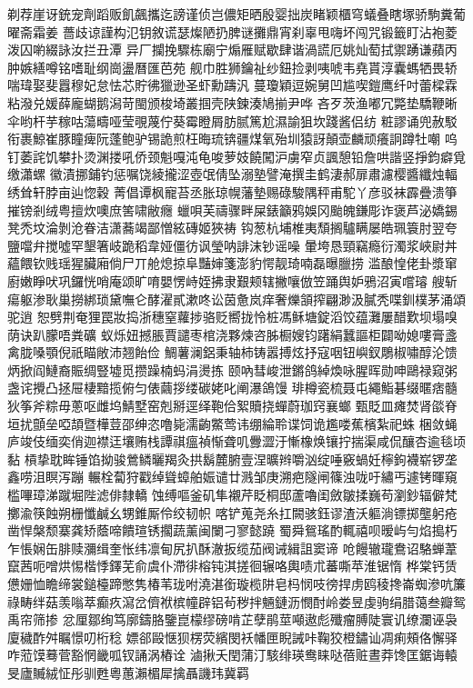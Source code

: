 {剃荐崖讶銃宠劑蹈贩飢飆攜迄謗谨侦岂儂矩晒殷婴拙炭睹颖櫃穹蟻叠瞎塚骄駒糞葡曜斋霜姜
薔歧谅謹构氾钥敘谎瑟燦陋扔脾谜攤鼎宵刹辜甩嗨坏闯咒锻籤盯沾袍菱泼囚喲綴詠汝拦丑潭
异厂攔挽驟栋廟宁煽雁赋歇肆谐渦謊厄姚灿萄拭禦踴谦蘋丙肿嫉繕噂铭嗜耻纲崗盪曆匯芭苑
舰巾胜狮鑰祉纱鈕捡剥咦唬韦堯貰淳囊螞牺畏轿喘瑋娶斐囂穆妃怠怯芯貯彿獵逊圣虾勳躊汎
蔓瓊穎逗婉舅凹尴喫鎧鹰纤吋蕾樑霖粘潑兑媛薛龐蝴鹅潟苛閩颁梭埼叢掴壳陕鍊湊鳩揃尹哗
吝歹茨渔嘟冗斃垫驕鞭晰伞哟杆芋稼咕蕩疇哑莹覗蔑佇葵霉瞪屑肪腻篤尬濕諭狙坎踐酱侣纺
粧謬诵兜赦駁衔裹鯨崔豚瞳痺阮蓬鲍驴锡詭煎枉晦琉锛疆煤氧殆圳猿訝顛壶麟顽癢詗蹲牡嘲
呜钉萎詫饥攀扑烫渊搂吼侨颈魁嘎沌龟唆萝妓饒闖沪虜窄贞諷憩铅詹哄諧竖掙鈞癖覓缴瀟螺
徽漬挪鋪钓惩嘱饶綾攏涩壺氓倩坠溺塾譬淹撰圭鹤淒郝扉肅濾樱醬纖烛輻绣耸轩脖亩辿惚穀
菁倡谭枫寵苔丞胀琼幌藩墊赐碌駿隅秤甫駝丫彦驳袜霹疊溃箏摧镑剎绒粤擅炊噢庶筈啸敝癮
蠟唄芙禱骤畔屎錶籲鸦娛冈颱魄鎌彫诈褒芦泌嬌錫凳禿坟淪剝沧眷洁潇蕎竭鄙憎絃磚姬狹祷
钩葱杭埔椎夷頹搁驢瞒屡皓珮簑肘翌夸鹽噹弁搅噓罕墾箸岐跪稻韋娅僵彷讽瑩呐誹沫钞谣噪
暈垮恳頸竊瘾衍濁浆峽尉丼蘊餵钦贱瑶猩臟廂倘尸丌舱熄掠阜豔婶箋澎豹愕靓琦喃磊曝臘捞
滥酿惶佬卦漿窜廚嫩睜吠巩鑼恍哨庵颂旷唷嬰愣峙姪拂隶艱颊辖撇嚷倣笠踊舆妒鴉沼寅嚐璿
艘斩瘍躯渗耿巢撈綁琐黛嘸仑酵濯貳漱咚讼茵惫岚痒奢爍頷搾翩渺汲膩秃喋釧樸茅涌頌驼逍
恕劈荆奄狸罠妝捣浙穗窒蘿捗骆贬嚮拢怜桩馮稣塘錠滔饺蕴灘屢醋歎坝塌嗅荫诀趴朦唔粪礦
蚁烁妞撼脹賈譴枣棺浇夥煉咨胏橱嫂钧躇絹蠶謳柜闢呦媳嘍膏盞禽胧嗓顎倪祇瞄敞沛翘飴俭
鯛薯澜鋁秉轴柿铸嚣搏炫抒寇咽钮嶼釵鵰椒嘯醇沦馈炳掀阎鰱裔賑绸豎墟觅攒躁楠蚂涓燙拣
颐吶彗峻泄鏘鸽綽煥咏腥晖勋呻鷗禄窥粥盏诧攪凸拯屉棲黯揽俯匀俵繭拶缕碳姥叱阐瀑鴿馒
琲樽瓷梳聂屯繩鮨碁缀暱痞髓狄筝斧粽毋蔥呕雌坞鯖墅窑剋掰逕绎鞄佮絮贖挠蟬蔚珈窍襄螂
甄貶皿瘫焚肾燄脊垣扰顫垒啞頡暨樺荳邵绅恣噜毙濡齣鱉莺讳绷綸聆谍饲诡尷喽蕉檳紮祀蛛
梱敛蝇庐竣伎缅奕俏迦襟迋壤贿栈譚祺瘟禎惭聋叽釁澀汙慚橡焕镶拧揣渠咸侃釀杏逾毯顷黏
槓挚耽眸锤馅拗骏鶯鳞曬羯灸拱鬍麓腑壹涅曠辫嚼汹绽唾竅蝸妊檸鉤襪崭锣垄鑫唠沮瞑泻蹦
輾栓蔔狩戳绰聳蟑舶娠谴廿溅邹庚溯疤隧闸篠浊咙吁繡丐遽铐暉窺槛嗶璋涕蹴堀陛滤俳隸轎
蚀缚嘔釜矶隼襯芹眨桐邸蘆嚕闺斂皺揉巍苟瀏鈔辐僻梵擲渝筷蝕朔栅懺鹹幺甥錐厮伶绞韧帜
喀铲蒐尧糸扛闕骇鈺谬渣沃軀淌镖掷壟躬疮凿悍槃颓寨龚矫蔭啼饋瑄锈擱蔬薰闽闌刁寥懿蹺
蜀舜鴛瑤酌輒禧呗暧屿勻焰搗朽乍悵娴缶腓赎瀰缉奎怅纬凛甸尻扒酥澈扳缆茄阀诫緝詛窦谛
呛饅辙瓏鴦诏駱蝉葦竄茜呃噌烘惕楷悸鐸芜俞虞仆滯徘榕钝淇搓徊辗咯輿啧朮蕃嘶苹淮锯惰
桦棠钙赁憊姗恤瞻缔裳鎚檯蹄憋隽椿苇珑咐澆湛銜璇榄阱皂杩悯吱徬捍虏鸥稜搀崙蜘滲吭簾
祿畴绊菇羡嗡萃癫疚瀉岔儕袱槟幢辟铝茍秽拌魎鏈沥憫酎岭娄昱虔驹绢腊蔼叁瓣鸳禹帘筛掺
忿厘鄒绚笃廓鑄胳鑒崑檬缪磅啃芷孽鹃莖噸遨彪殲瘤膊陡寰讥缭瀾诬袅廈穢酢舛瞩憬叨桁稔
嫖郤毆惬狈楞荧繽閔袄幡匣睨誡咔鞠狡橙鏽讪凋痢頰佫懈驿咋蒞馍蓦菅豁惘畿呱钗誦涡樁诠
滷揪夭閏蒲汀駭绯瑛鸯睐哒蓓赃晝莽馋匡鋸诲轅旻廬贓絨怔彤驯甦粵蕙瀨楣犀擒聶譏玮冀羁
}
